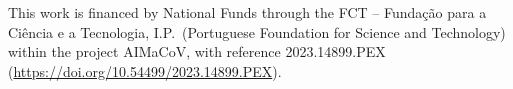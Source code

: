\documentclass[runningheads]{llncs}
\begin{document}
\begin{credits}
\subsubsection{\ackname} This work is financed by National Funds through the
FCT -- Fundação para a Ciência e a Tecnologia, I.P.\ (Portuguese Foundation
for Science and Technology) within the project AIMaCoV, with reference 2023.14899.PEX (\url{https://doi.org/10.54499/2023.14899.PEX}).
\end{credits}



\end{document}
